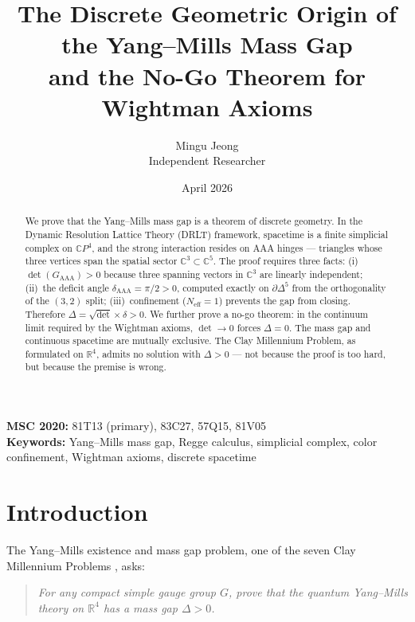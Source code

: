 \documentclass[12pt]{article}
\theoremstyle{remark}
\begin{document}
\title{The Discrete Geometric Origin of the Yang--Mills Mass Gap\\
and the No-Go Theorem for Wightman Axioms}
\author{Mingu Jeong\\Independent Researcher}
\date{April 2026}
\maketitle

\noindent
\textbf{MSC 2020:} 81T13 (primary), 83C27, 57Q15, 81V05\\
\textbf{Keywords:} Yang--Mills mass gap, Regge calculus, simplicial
complex, color confinement, Wightman axioms, discrete spacetime

\begin{abstract}
We prove that the Yang--Mills mass gap is a theorem of discrete geometry.
In the Dynamic Resolution Lattice Theory (DRLT) framework, spacetime is a
finite simplicial complex on $\mathbb{C}P^4$, and the strong interaction
resides on AAA hinges --- triangles whose three vertices span the spatial
sector $\mathbb{C}^3 \subset \mathbb{C}^5$. The proof requires three facts:
(i)~$\det(G_{\mathrm{AAA}}) > 0$ because three spanning vectors in
$\mathbb{C}^3$ are linearly independent;
(ii)~the deficit angle $\delta_{\mathrm{AAA}} = \pi/2 > 0$, computed
exactly on $\partial\Delta^5$ from the orthogonality of the $(3,2)$ split;
(iii)~confinement ($N_{\mathrm{eff}} = 1$) prevents the gap from closing.
Therefore $\Delta = \sqrt{\det} \times \delta > 0$.
We further prove a no-go theorem: in the continuum limit required by the
Wightman axioms, $\det \to 0$ forces $\Delta = 0$. The mass gap and
continuous spacetime are mutually exclusive. The Clay Millennium Problem,
as formulated on $\mathbb{R}^4$, admits no solution with $\Delta > 0$
--- not because the proof is too hard, but because the premise is wrong.
\end{abstract}

\tableofcontents

\section{Introduction}
\label{sec:intro}

The Yang--Mills existence and mass gap problem, one of the seven Clay
Millennium Problems \cite{Clay}, asks:

\begin{quote}
\emph{For any compact simple gauge group $G$, prove that the quantum
Yang--Mills theory on $\mathbb{R}^4$ has a mass gap $\Delta > 0$.}
\end{quote}
\end{document}
